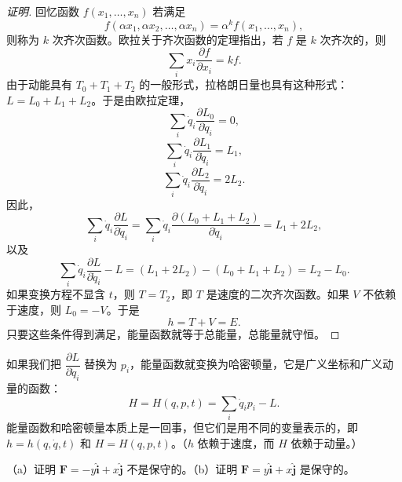\begin{proof}[证明]
回忆函数 $f(x_1, \ldots, x_n)$ 若满足
\begin{equation}\label{eq:1.hom}
f(\alpha x_1, \alpha x_2, \ldots, \alpha x_n) = \alpha^k f(x_1, \ldots, x_n),
\end{equation}
则称为 $k$ 次齐次函数。欧拉关于齐次函数的定理指出，若 $f$ 是 $k$ 次齐次的，则
\begin{equation}\label{eq:1.euler}
\sum_i x_i\frac{\partial f}{\partial x_i} = kf.
\end{equation}
由于动能具有 $T_0 + T_1 + T_2$ 的一般形式，拉格朗日量也具有这种形式：$L = L_0 + L_1 + L_2$。于是由欧拉定理，
\begin{equation*}
\sum_i\dot{q}_i\frac{\partial L_0}{\partial \dot{q}_i} = 0,
\end{equation*}
\begin{equation*}
\sum_i\dot{q}_i\frac{\partial L_1}{\partial \dot{q}_i} = L_1,
\end{equation*}
\begin{equation*}
\sum_i\dot{q}_i\frac{\partial L_2}{\partial \dot{q}_i} = 2L_2.
\end{equation*}
因此，
\begin{equation}\label{eq:1.L12}
\sum_i\dot{q}_i\frac{\partial L}{\partial \dot{q}_i} = \sum_i\dot{q}_i\frac{\partial (L_0 + L_1 + L_2)}{\partial \dot{q}_i} = L_1 + 2L_2,
\end{equation}
以及
\begin{equation}\label{eq:1.L20}
\sum_i\dot{q}_i\frac{\partial L}{\partial \dot{q}_i} - L = (L_1 + 2L_2) - (L_0 + L_1 + L_2) = L_2 - L_0.
\end{equation}
如果变换方程不显含 $t$，则 $T = T_2$，即 $T$ 是速度的二次齐次函数。如果 $V$ 不依赖于速度，则 $L_0 = -V$。于是
\begin{equation}\label{eq:1.hE}
h = T + V = E.
\end{equation}
只要这些条件得到满足，能量函数就等于总能量，总能量就守恒。
\end{proof}

如果我们把 $\dfrac{\partial L}{\partial \dot{q}_i}$ 替换为 $p_i$，能量函数就变换为哈密顿量，它是广义坐标和广义动量的函数：
\begin{equation}\label{eq:1.H}
H = H(q, p, t) = \sum_i\dot{q}_ip_i - L.
\end{equation}
能量函数和哈密顿量本质上是一回事，但它们是用不同的变量表示的，即 $h = h(q, \dot{q}, t)$ 和 $H = H(q, p, t)$。（$h$ 依赖于速度，而 $H$ 依赖于动量。）

\begin{example}
（a）证明 $\mathbf{F} = -y\hat{\mathbf{i}} + x\hat{\mathbf{j}}$ 不是保守的。（b）证明 $\mathbf{F} = y\hat{\mathbf{i}} + x\hat{\mathbf{j}}$ 是保守的。
\end{example}

